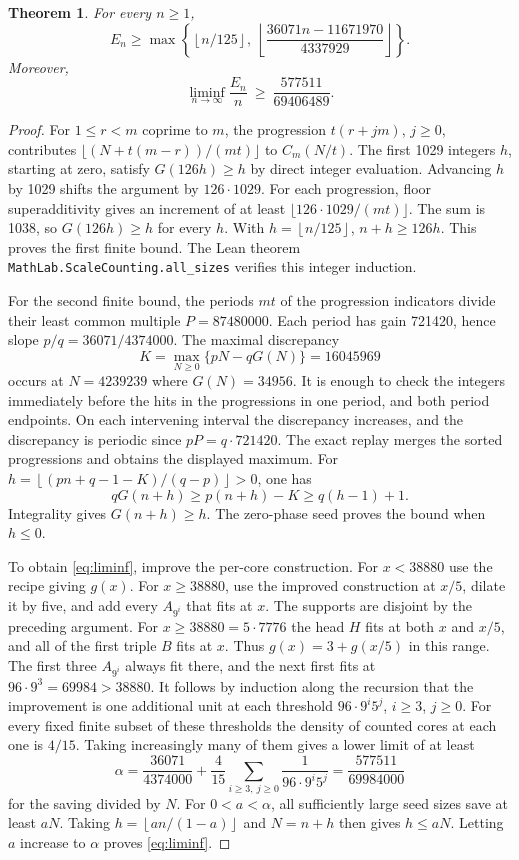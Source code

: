 \documentclass[11pt]{article}
\newtheorem{theorem}{Theorem}
\theoremstyle{definition}
\newcommand{\fl}[1]{\left\lfloor #1\right\rfloor}
\begin{document}
\begin{theorem}\label{thm:main}
For every \(n\ge1\),
\[
 E_n\ge
 \max\left\{\fl{n/125},\
           \fl{\frac{36071n-11671970}{4337929}}\right\}.
 \tag{3}\label{eq:finite}
\]
Moreover,
\[
       \liminf_{n\to\infty}\frac{E_n}{n}
       \ \ge\ \frac{577511}{69406489}.
 \tag{4}\label{eq:liminf}
\]
\end{theorem}

\begin{proof}
For \(1\le r<m\) coprime to \(m\), the progression \(t(r+jm)\),
\(j\ge0\), contributes
\(\lfloor(N+t(m-r))/(mt)\rfloor\) to \(C_m(N/t)\). The
first 1029 integers \(h\), starting at zero, satisfy
\(G(126h)\ge h\) by direct integer evaluation. Advancing \(h\)
by 1029 shifts the argument by \(126\cdot1029\). For each progression,
floor superadditivity gives an increment of at least
\(\lfloor126\cdot1029/(mt)\rfloor\). The sum is 1038, so
\(G(126h)\ge h\) for every \(h\). With \(h=\fl{n/125}\),
\(n+h\ge126h\). This proves the first finite bound.
The Lean theorem \texttt{MathLab.ScaleCounting.all\_sizes}
verifies this integer induction.

For the second finite bound, the periods \(mt\) of the progression
indicators divide their least common multiple \(P=87480000\).
Each period has gain 721420, hence slope \(p/q=36071/4374000\).
The maximal discrepancy
\[
      K=\max_{N\ge0}\{pN-qG(N)\}=16045969
\]
occurs at \(N=4239239\) where \(G(N)=34956\). It is enough
to check the integers immediately before the hits in the progressions
in one period, and both period endpoints. On each intervening interval
the discrepancy increases, and the discrepancy is periodic since
\(pP=q\cdot721420\). The exact replay merges the sorted
progressions and obtains the displayed maximum. For
\(h=\fl{(pn+q-1-K)/(q-p)}>0\), one has
\[
   qG(n+h)\ge p(n+h)-K\ge q(h-1)+1 .
\]
Integrality gives \(G(n+h)\ge h\). The zero-phase seed proves the
bound when \(h\le0\).

To obtain \eqref{eq:liminf}, improve the per-core construction.
For \(x<38880\) use the recipe giving \(g(x)\). For
\(x\ge38880\), use the improved construction at \(x/5\),
dilate it by five, and add every \(A_{9^i}\) that fits at \(x\).
The supports are disjoint by the preceding argument. For
\(x\ge38880=5\cdot7776\) the head \(H\) fits at both \(x\)
and \(x/5\), and all of the first triple \(B\) fits at \(x\).
Thus \(g(x)=3+g(x/5)\) in this range. The first three
\(A_{9^i}\) always fit there, and the next first fits at
\(96\cdot9^3=69984>38880\). It follows by induction along the
recursion that the improvement is one additional unit at each
threshold \(96\cdot9^i5^j\), \(i\ge3\), \(j\ge0\).
For every fixed finite subset of these thresholds the density of counted
cores at each one is \(4/15\). Taking increasingly many of them gives
a lower limit of at least
\[
 \alpha=\frac{36071}{4374000}
    +\frac4{15}\sum_{i\ge3,\ j\ge0}
       \frac{1}{96\cdot9^i5^j}
    =\frac{577511}{69984000}
\]
for the saving divided by \(N\).
For \(0<a<\alpha\), all sufficiently large seed sizes save at least
\(aN\). Taking \(h=\fl{an/(1-a)}\) and \(N=n+h\)
then gives \(h\le aN\). Letting \(a\) increase to \(\alpha\)
proves \eqref{eq:liminf}.
\end{proof}
\end{document}
